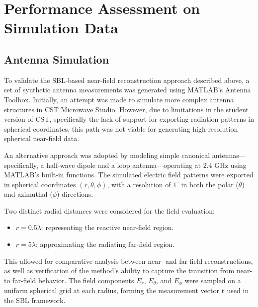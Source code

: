 \documentclass{article}
\begin{document}
\section{Performance Assessment on Simulation Data}
\subsection{Antenna Simulation}

To validate the SBL-based near-field reconstruction approach described above, a set of synthetic antenna measurements was generated using MATLAB's Antenna Toolbox. Initially, an attempt was made to simulate more complex antenna structures in CST Microwave Studio. However, due to limitations in the student version of CST, specifically the lack of support for exporting radiation patterns in spherical coordinates, this path was not viable for generating high-resolution spherical near-field data.

An alternative approach was adopted by modeling simple canonical antennas—specifically, a half-wave dipole and a loop antenna—operating at 2.4 GHz using MATLAB’s built-in functions. The simulated electric field patterns were exported in spherical coordinates $(r, \theta, \phi)$, with a resolution of $1^\circ$ in both the polar ($\theta$) and azimuthal ($\phi$) directions.

Two distinct radial distances were considered for the field evaluation:
\begin{itemize}
    \item $r = 0.5\lambda$: representing the reactive near-field region.
    \item $r = 5\lambda$: approximating the radiating far-field region.
\end{itemize}

This allowed for comparative analysis between near- and far-field reconstructions, as well as verification of the method’s ability to capture the transition from near- to far-field behavior. The field components $E_r$, $E_\theta$, and $E_\phi$ were sampled on a uniform spherical grid at each radius, forming the measurement vector $\mathbf{t}$ used in the SBL framework. 
\end{document}
